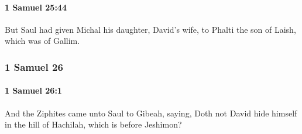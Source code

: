 		\paragraph{1 Samuel 25:44} %
			\label{1SAMUEL-25-44}

			But Saul had given Michal his daughter, David’s wife, to Phalti the son of Laish, which was of Gallim.

	\subsubsection{1 Samuel 26} %
		\label{1SAMUEL-26}

		\paragraph{1 Samuel 26:1} %
			\label{1SAMUEL-26-1}

			And the Ziphites came unto Saul to Gibeah, saying, Doth not David hide himself in the hill of Hachilah, which is before Jeshimon?

